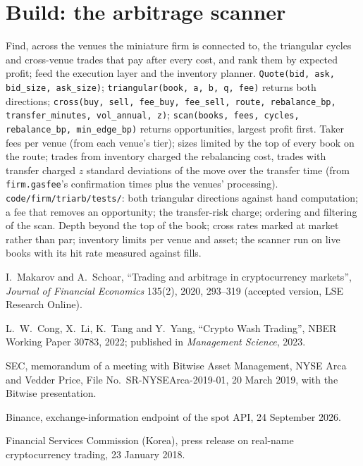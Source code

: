 \section{Build: the arbitrage scanner}\label{bld:m3:spot-markets:triarb}

\begin{build}
 Find, across the venues the miniature firm is connected to, the triangular cycles and cross-venue
trades that pay after every cost, and rank them by expected profit; feed the execution layer and the inventory
planner.
 \texttt{Quote(bid, ask, bid\_size, ask\_size)}; \texttt{triangular(book, a, b, q, fee)} returns
both directions; \texttt{cross(buy, sell, fee\_buy, fee\_sell, route, rebalance\_bp, transfer\_minutes, vol\_annual,
z)}; \texttt{scan(books, fees, cycles, rebalance\_bp, min\_edge\_bp)} returns opportunities, largest profit first.
 Taker fees per venue (from each venue's tier); sizes limited by the top of every book on the route;
trades from inventory charged the rebalancing cost, trades with transfer charged $z$ standard deviations of the
move over the transfer time (from \texttt{firm.gasfee}'s confirmation times plus the venues' processing).
 \texttt{code/firm/triarb/tests/}: both triangular directions against hand computation; a
fee that removes an opportunity; the transfer-risk charge; ordering and filtering of the scan.
 Depth beyond the top of the book;  cross rates marked at market rather than par; inventory
limits per venue and asset; the scanner run on live books with its hit rate measured against fills.
\end{build}

\begin{omsources}
\item I.~Makarov and A.~Schoar, ``Trading and arbitrage in cryptocurrency markets'', \emph{Journal of Financial
Economics} 135(2), 2020, 293--319 (accepted version, LSE Research Online).
\item L.~W.~Cong, X.~Li, K.~Tang and Y.~Yang, ``Crypto Wash Trading'', NBER Working Paper 30783, 2022; published in
\emph{Management Science}, 2023.
\item SEC, memorandum of a meeting with Bitwise Asset Management, NYSE Arca and Vedder Price, File No.\
SR-NYSEArca-2019-01, 20 March 2019, with the Bitwise presentation.
\item Binance, exchange-information endpoint of the spot API, 24 September 2026.
\item Financial Services Commission (Korea), press release on real-name cryptocurrency trading, 23 January 2018.
\end{omsources}

